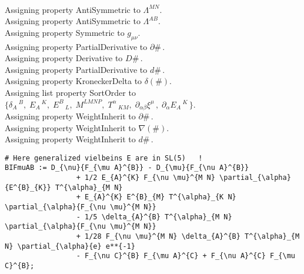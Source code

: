 \documentclass[11pt]{article}
\begin{document}
\\
Assigning property AntiSymmetric to ${\Lambda}^{M N}$.
\\
Assigning property AntiSymmetric to ${\Lambda}^{A B}$.
\\
Assigning property Symmetric to ${g}_{\mu \nu}$.
\\
Assigning property PartialDerivative to $\partial{\#}\, $.
\\
Assigning property Derivative to $D{\#}\, $.
\\
Assigning property PartialDerivative to $d{\#}\, $.
\\
Assigning property KroneckerDelta to $\delta(\#)$.
\\
Assigning list property SortOrder to $\{{\delta}_{A}\,^{B},\; {E}_{A}\,^{K},\; {E}^{B}\,_{L},\; {M}^{L M N P},\; {T}^{\alpha}\,_{K M},\; {\partial}_{\alpha \beta}{{\xi}^{\mu}}\, ,\; {\partial}_{\alpha}{{E}_{A}\,^{K}}\, \}$.
\\
Assigning property WeightInherit to $\partial{\#}\, $.
\\
Assigning property WeightInherit to $\nabla(\#)$.
\\
Assigning property WeightInherit to $d{\#}\, $.
\\
{\color[named]{Blue}\begin{verbatim}
# Here generalized vielbeins E are in SL(5)   !
BIFmuAB := D_{\nu}{F_{\mu A}^{B}} - D_{\mu}{F_{\nu A}^{B}}
                 + 1/2 E_{A}^{K} F_{\nu \mu}^{M N} \partial_{\alpha}{E^{B}_{K}} T^{\alpha}_{M N}
                 + E_{A}^{K} E^{B}_{M} T^{\alpha}_{K N} \partial_{\alpha}{F_{\nu \mu}^{M N}}
                 - 1/5 \delta_{A}^{B} T^{\alpha}_{M N} \partial_{\alpha}{F_{\nu \mu}^{M N}}
                 + 1/28 F_{\nu \mu}^{M N} \delta_{A}^{B} T^{\alpha}_{M N} \partial_{\alpha}{e} e**{-1}
                 - F_{\nu C}^{B} F_{\mu A}^{C} + F_{\nu A}^{C} F_{\mu C}^{B};
\end{verbatim}}
\end{document}

